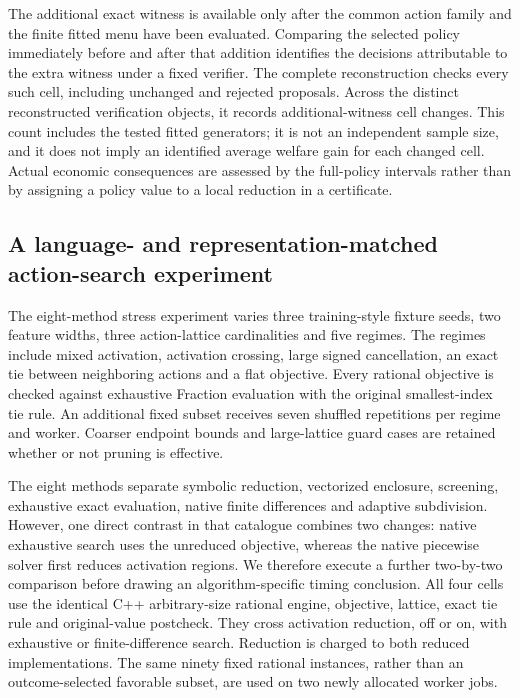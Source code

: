 The additional exact witness is available only after the common action family and the finite fitted menu have been evaluated. Comparing the selected policy immediately before and after that addition identifies the decisions attributable to the extra witness under a fixed verifier. The complete reconstruction checks every such cell, including unchanged and rejected proposals. Across the distinct reconstructed verification objects, it records \NBOExtraChanges{} additional-witness cell changes. This count includes the tested fitted generators; it is not an independent sample size, and it does not imply an identified average welfare gain for each changed cell. Actual economic consequences are assessed by the full-policy intervals rather than by assigning a policy value to a local reduction in a certificate.

\subsection{A language- and representation-matched action-search experiment}
The eight-method stress experiment varies three training-style fixture seeds, two feature widths, three action-lattice cardinalities and five regimes. The regimes include mixed activation, activation crossing, large signed cancellation, an exact tie between neighboring actions and a flat objective. Every rational objective is checked against exhaustive Fraction evaluation with the original smallest-index tie rule. An additional fixed subset receives seven shuffled repetitions per regime and worker. Coarser endpoint bounds and large-lattice guard cases are retained whether or not pruning is effective.

The eight methods separate symbolic reduction, vectorized enclosure, screening, exhaustive exact evaluation, native finite differences and adaptive subdivision. However, one direct contrast in that catalogue combines two changes: native exhaustive search uses the unreduced objective, whereas the native piecewise solver first reduces activation regions. We therefore execute a further two-by-two comparison before drawing an algorithm-specific timing conclusion. All four cells use the identical C++ arbitrary-size rational engine, objective, lattice, exact tie rule and original-value postcheck. They cross activation reduction, off or on, with exhaustive or finite-difference search. Reduction is charged to both reduced implementations. The same ninety fixed rational instances, rather than an outcome-selected favorable subset, are used on two newly allocated worker jobs.

